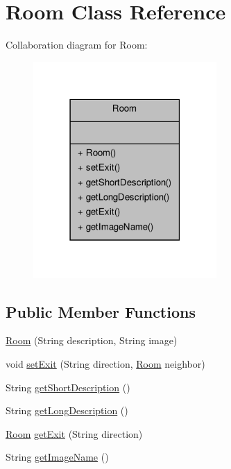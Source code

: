 \hypertarget{classRoom}{\section{Room Class Reference}
\label{classRoom}
}


Collaboration diagram for Room\-:\nopagebreak
\begin{figure}[H]
\begin{center}
\leavevmode
\includegraphics[width=198pt]{classRoom__coll__graph}
\end{center}
\end{figure}
\subsection*{Public Member Functions}
\begin{DoxyCompactItemize}
\item 
\hyperlink{classRoom_a2cdcbb3d86746330a5a01c7fae4de02c}{Room} (String description, String image)
\item 
void \hyperlink{classRoom_ae4bc6837f331b5249beb0651fc277018}{set\-Exit} (String direction, \hyperlink{classRoom}{Room} neighbor)
\item 
String \hyperlink{classRoom_a85e561bc5fa9d9c965300e9ad264b02a}{get\-Short\-Description} ()
\item 
String \hyperlink{classRoom_a23a25854d7544fb0b41190a4d6bd1322}{get\-Long\-Description} ()
\item 
\hyperlink{classRoom}{Room} \hyperlink{classRoom_a384ab8c844e5775f87de24d6c470637e}{get\-Exit} (String direction)
\item 
String \hyperlink{classRoom_a8177668df4d8be718812934673c42649}{get\-Image\-Name} ()
\end{DoxyCompactItemize}


